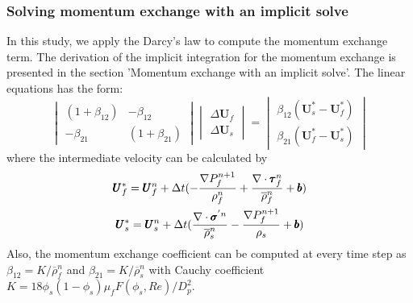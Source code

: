\documentclass[preprint,12pt]{elsarticle}
\begin{document}
\subsubsection{Solving momentum exchange with an implicit solve}
In this study, we apply the Darcy's law to compute the momentum exchange term. The derivation of the implicit integration for the momentum exchange is presented in the section 'Momentum exchange with an implicit solve'. The linear equations 
has the form:
%
\[ \begin{vmatrix} (1 + \beta_{12})  &  -\beta_{12} \\
                  -\beta_{21}       &  (1 + \beta_{21})
    \end{vmatrix}
    \begin{vmatrix} \Delta \pmb{U}_{f} \\
                    \Delta \pmb{U}_{s}
    \end{vmatrix}
    =
    \begin{vmatrix}  \beta_{12}(\pmb{U}_{s}^{*} - \pmb{U}_{f}^{*}) \\
                    \beta_{21}(\pmb{U}_{f}^{*} - \pmb{U}_{s}^{*})
    \end{vmatrix}                
\]
%
%
where the intermediate velocity can be calculated by
%
\begin{equation}
\begin{gathered}
\pmb{U}_{f}^{*} = \pmb{U}_{f}^{n} + \Delta{t} (-\frac{\nabla P_{f}^{n+1}}{\rho_f^n}  + \frac {\nabla \cdot \pmb{\tau}_f^{n}}{\overline{\rho}^n_{f}} + \pmb{b}) \\
\pmb{U}_{s}^{*} = \pmb{U}_{s}^{n} + \Delta{t} (\frac{\nabla \cdot \pmb{\sigma}^{'n}}{\overline{\rho}^n_{s}}    - \frac{\nabla P_{f}^{n+1}}{\rho_s}  + \pmb{b})
\end{gathered}
\end{equation}
%
%
Also, the momentum exchange coefficient can be computed at every time step as $\beta_{12} = K/\overline{\rho}_{f}^n$ and $\beta_{21} = K/\overline{\rho}_{s}^n$ with Cauchy coefficient $K =  18\phi_s(1-\phi_s)\mu_f  F(\phi_s, Re) /D_p^2$.

\end{document}
